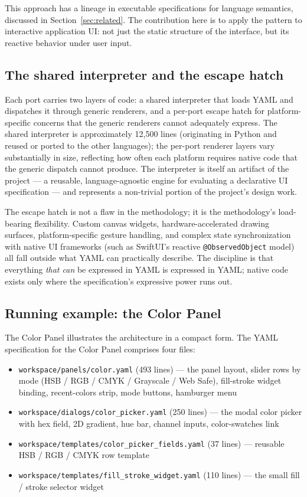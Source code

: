 \documentclass[10pt]{article}
\begin{document}
This approach has a lineage in executable specifications for language
semantics, discussed in Section~\ref{sec:related}. The contribution here is
to apply the pattern to interactive application UI: not just the static
structure of the interface, but its reactive behavior under user input.

\subsection{The shared interpreter and the escape hatch}

Each port carries two layers of code: a shared interpreter that loads YAML
and dispatches it through generic renderers, and a per-port escape hatch
for platform-specific concerns that the generic renderers cannot
adequately express. The shared interpreter is approximately 12{,}500 lines
(originating in Python and reused or ported to the other languages); the
per-port renderer layers vary substantially in size, reflecting how often
each platform requires native code that the generic dispatch cannot
produce. The interpreter is itself an artifact of the project --- a
reusable, language-agnostic engine for evaluating a declarative UI
specification --- and represents a non-trivial portion of the project's
design work.

The escape hatch is not a flaw in the methodology; it is the methodology's
load-bearing flexibility. Custom canvas widgets, hardware-accelerated
drawing surfaces, platform-specific gesture handling, and complex state
synchronization with native UI frameworks (such as SwiftUI's reactive
\texttt{@ObservedObject} model) all fall outside what YAML can practically
describe. The discipline is that everything \emph{that can} be expressed
in YAML is expressed in YAML; native code exists only where the
specification's expressive power runs out.

\subsection{Running example: the Color Panel}
\label{sec:colorpanel}

The Color Panel illustrates the architecture in a compact form. The YAML
specification for the Color Panel comprises four files:
\begin{itemize}[leftmargin=*]
\item \texttt{workspace/panels/color.yaml} (493 lines) --- the panel
  layout, slider rows by mode (HSB / RGB / CMYK / Grayscale / Web Safe),
  fill-stroke widget binding, recent-colors strip, mode buttons, hamburger
  menu
\item \texttt{workspace/dialogs/color\_picker.yaml} (250 lines) --- the
  modal color picker with hex field, 2D gradient, hue bar, channel inputs,
  color-swatches link
\item \texttt{workspace/templates/color\_picker\_fields.yaml} (37 lines)
  --- reusable HSB / RGB / CMYK row template
\item \texttt{workspace/templates/fill\_stroke\_widget.yaml} (110 lines)
  --- the small fill / stroke selector widget
\end{itemize}
\end{document}
